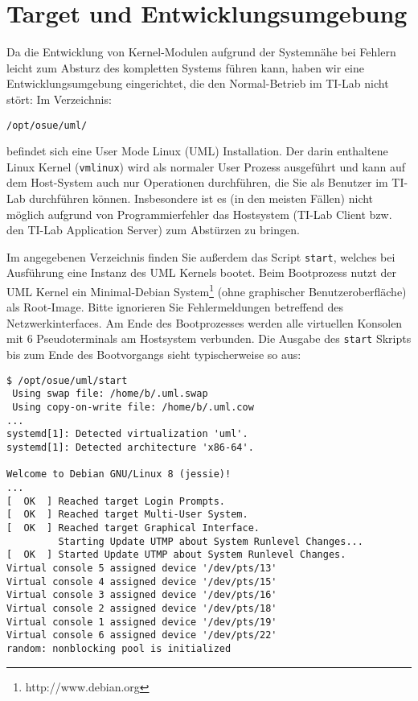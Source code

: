 \documentclass{article}
\begin{document}
\section*{Target und Entwicklungsumgebung}
Da die Entwicklung von Kernel-Modulen aufgrund der Systemn{\"a}he bei
Fehlern leicht zum Absturz des kompletten Systems f{\"u}hren kann,
haben wir eine Entwicklungsumgebung eingerichtet, die den
Normal-Betrieb im TI-Lab nicht st{\"o}rt: Im Verzeichnis:
\begin{verbatim}
/opt/osue/uml/
\end{verbatim}
befindet sich eine User Mode Linux (UML) Installation. Der darin
enthaltene Linux Kernel (\verb|vmlinux|) wird als normaler User
Prozess ausgef{\"u}hrt und kann auf dem Host-System auch nur
Operationen durchf{\"u}hren, die Sie als Benutzer im TI-Lab durchf{\"u}hren
k{\"o}nnen. Insbesondere ist es (in den meisten F{\"a}llen)
nicht m{\"o}glich aufgrund von Programmierfehler das Hostsystem
(TI-Lab Client bzw. den TI-Lab Application Server) zum Abst{\"u}rzen zu bringen.

Im angegebenen Verzeichnis finden Sie au{\ss}erdem das Script
\texttt{start}, welches bei Ausf{\"u}hrung eine Instanz des UML
Kernels bootet. Beim Bootprozess nutzt der UML Kernel ein
Minimal-Debian System\footnote{http://www.debian.org} (ohne
graphischer Benutzeroberfl{\"a}che) als Root-Image. Bitte ignorieren
Sie Fehlermeldungen betreffend des Netzwerkinterfaces. Am Ende des
Bootprozesses werden alle virtuellen Konsolen mit 6 Pseudoterminals am
Hostsystem verbunden. Die Ausgabe des \verb|start| Skripts bis
zum Ende des Bootvorgangs sieht typischerweise so aus:
\begin{verbatim}
$ /opt/osue/uml/start
 Using swap file: /home/b/.uml.swap
 Using copy-on-write file: /home/b/.uml.cow
...
systemd[1]: Detected virtualization 'uml'.
systemd[1]: Detected architecture 'x86-64'.

Welcome to Debian GNU/Linux 8 (jessie)!
...
[  OK  ] Reached target Login Prompts.
[  OK  ] Reached target Multi-User System.
[  OK  ] Reached target Graphical Interface.
         Starting Update UTMP about System Runlevel Changes...
[  OK  ] Started Update UTMP about System Runlevel Changes.
Virtual console 5 assigned device '/dev/pts/13'
Virtual console 4 assigned device '/dev/pts/15'
Virtual console 3 assigned device '/dev/pts/16'
Virtual console 2 assigned device '/dev/pts/18'
Virtual console 1 assigned device '/dev/pts/19'
Virtual console 6 assigned device '/dev/pts/22'
random: nonblocking pool is initialized
\end{verbatim}
\end{document}
